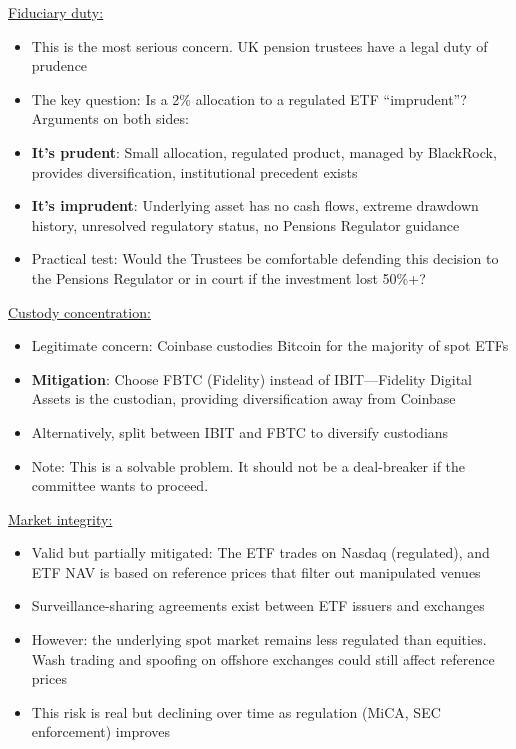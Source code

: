 \documentclass[11pt]{article}
\begin{document}
\medskip
\noindent\underline{Fiduciary duty:}
\begin{itemize}[leftmargin=*]
\item This is the most serious concern. UK pension trustees have a legal duty of prudence
\item The key question: Is a 2\% allocation to a regulated ETF ``imprudent''? Arguments on both sides:
\item \textbf{It's prudent}: Small allocation, regulated product, managed by BlackRock, provides diversification, institutional precedent exists
\item \textbf{It's imprudent}: Underlying asset has no cash flows, extreme drawdown history, unresolved regulatory status, no Pensions Regulator guidance
\item Practical test: Would the Trustees be comfortable defending this decision to the Pensions Regulator or in court if the investment lost 50\%+?
\end{itemize}

\medskip
\noindent\underline{Custody concentration:}
\begin{itemize}[leftmargin=*]
\item Legitimate concern: Coinbase custodies Bitcoin for the majority of spot ETFs
\item \textbf{Mitigation}: Choose FBTC (Fidelity) instead of IBIT---Fidelity Digital Assets is the custodian, providing diversification away from Coinbase
\item Alternatively, split between IBIT and FBTC to diversify custodians
\item Note: This is a solvable problem. It should not be a deal-breaker if the committee wants to proceed.
\end{itemize}

\medskip
\noindent\underline{Market integrity:}
\begin{itemize}[leftmargin=*]
\item Valid but partially mitigated: The ETF trades on Nasdaq (regulated), and ETF NAV is based on reference prices that filter out manipulated venues
\item Surveillance-sharing agreements exist between ETF issuers and exchanges
\item However: the underlying spot market remains less regulated than equities. Wash trading and spoofing on offshore exchanges could still affect reference prices
\item This risk is real but declining over time as regulation (MiCA, SEC enforcement) improves
\end{itemize}
\end{document}
